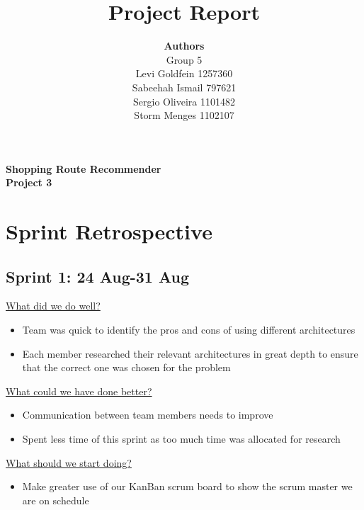 \documentclass[12pt]{article}
\begin{document}
 
 
\title{Project Report }
\author{\textbf{Authors}\\Group 5\\Levi Goldfein 1257360\\Sabeehah Ismail 797621\\ Sergio Oliveira 1101482 \\Storm Menges 1102107}
\maketitle

\begin{center}
\LARGE
\textbf{Shopping Route Recommender\\Project 3}
\end{center}
\pagebreak



\tableofcontents
\pagebreak


\section{Sprint Retrospective}
\subsection{Sprint 1: 24 Aug-31 Aug}
\underline{What did we do well?}
\begin{itemize}
\item Team was quick to identify the pros and cons of using different architectures
\item Each member researched their relevant architectures in great depth to ensure that the correct one was chosen for the problem 
\end{itemize}
\underline{What could we have done better?}
\begin{itemize}
\item Communication between team members needs to improve 
\item Spent less time of this sprint as too much time was allocated for research 
\end{itemize}
\underline{What should we start doing?}
\begin{itemize}
\item Make greater use of our KanBan scrum board to show the scrum master we are on schedule
\end{itemize}
\end{document}
